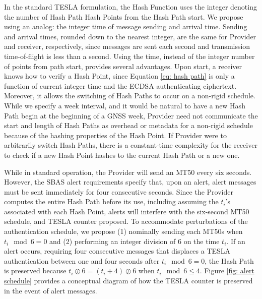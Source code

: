 \documentclass[letterpaper,times]{IONconf/IONconf}
\begin{document}
In the standard TESLA formulation, the Hash Function uses the integer denoting the number of Hash Path Hash Points from the Hash Path start.
We propose using an analog: the integer time of message sending and arrival time.
Sending and arrival times, rounded down to the nearest integer, are the same for Provider and receiver, respectively, since messages are sent each second and transmission time-of-flight is less than a second.
Using the time, instead of the integer number of points from path start, provides several advantages.
Upon start, a receiver knows how to verify a Hash Point, since Equation \eqref{eq: hash path} is only a function of current integer time and the ECDSA authenticating ciphertext.
Moreover, it allows the switching of Hash Paths to occur on a non-rigid schedule.
While we specify a week interval, and it would be natural to have a new Hash Path begin at the beginning of a GNSS week, Provider need not communicate the start and length of Hash Paths as overhead or metadata for a non-rigid schedule because of the hashing properties of the Hash Point.
If Provider were to arbitrarily switch Hash Paths, there is a constant-time complexity for the receiver to check if a new Hash Point hashes to the current Hash Path or a new one.

While in standard operation, the Provider will send an MT50 every six seconds.
However, the SBAS alert requirements specify that, upon an alert, alert messages must be sent immediately for four consecutive seconds.
Since the Provider computes the entire Hash Path before its use, including assuming the $t_i$'s associated with each Hash Point, alerts will interfere with the six-second MT50 schedule, and TESLA counter proposed.
To accommodate perturbations of the authentication schedule, we propose (1) nominally sending each MT50s when $t_i \mod 6 = 0$ and (2) performing an integer division of 6 on the time $t_i$.
If an alert occurs, requiring four consecutive messages that displaces a TESLA authentication between one and four seconds after $t_i \mod 6 = 0$, the Hash Path is preserved because $t_i \oslash 6 = (t_i + 4) \oslash 6$ when $t_i \mod 6 \leq 4 $.
Figure \ref{fig: alert schedule} provides a conceptual diagram of how the TESLA counter is preserved in the event of alert messages.
\end{document}
